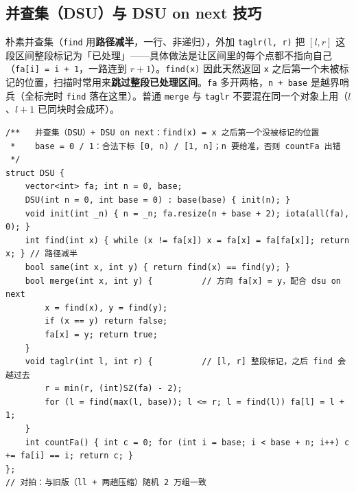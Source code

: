 \subsection{并查集（DSU）与 DSU on next 技巧}

朴素并查集（\texttt{find} 用\textbf{路径减半}，一行、非递归），外加 \texttt{taglr(l, r)} 把 $[l, r]$ 这段区间整段标记为「已处理」——具体做法是让区间里的每个点都不指向自己（\texttt{fa[i] = i + 1}，一路连到 $r+1$）。\texttt{find(x)} 因此天然返回 \texttt{x} 之后第一个未被标记的位置，扫描时常用来\textbf{跳过整段已处理区间}。\texttt{fa} 多开两格，\texttt{n + base} 是越界哨兵（全标完时 \texttt{find} 落在这里）。普通 \texttt{merge} 与 \texttt{taglr} 不要混在同一个对象上用（$l$、$l+1$ 已同块时会成环）。

\begin{verbatim}
/**   并查集（DSU）+ DSU on next：find(x) = x 之后第一个没被标记的位置
 *    base = 0 / 1：合法下标 [0, n) / [1, n]；n 要给准，否则 countFa 出错
 */
struct DSU {
    vector<int> fa; int n = 0, base;
    DSU(int n = 0, int base = 0) : base(base) { init(n); }
    void init(int _n) { n = _n; fa.resize(n + base + 2); iota(all(fa), 0); }
    int find(int x) { while (x != fa[x]) x = fa[x] = fa[fa[x]]; return x; } // 路径减半
    bool same(int x, int y) { return find(x) == find(y); }
    bool merge(int x, int y) {          // 方向 fa[x] = y，配合 dsu on next
        x = find(x), y = find(y);
        if (x == y) return false;
        fa[x] = y; return true;
    }
    void taglr(int l, int r) {          // [l, r] 整段标记，之后 find 会越过去
        r = min(r, (int)SZ(fa) - 2);
        for (l = find(max(l, base)); l <= r; l = find(l)) fa[l] = l + 1;
    }
    int countFa() { int c = 0; for (int i = base; i < base + n; i++) c += fa[i] == i; return c; }
};
// 对拍：与旧版（ll + 两趟压缩）随机 2 万组一致
\end{verbatim}
